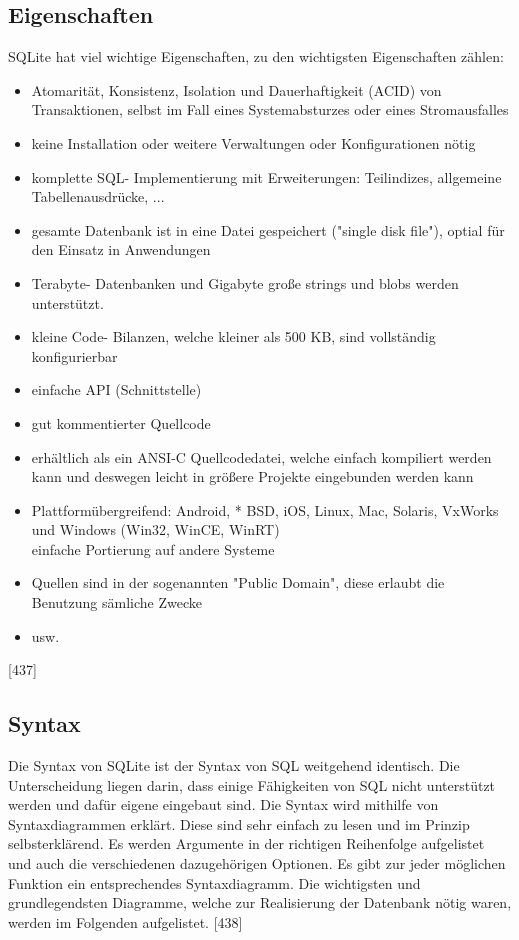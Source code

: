 \documentclass[12pt,a4paper]{report}
\begin{document}
\begin{onehalfspace}
\subsection{Eigenschaften}
SQLite hat viel wichtige Eigenschaften, zu den wichtigsten Eigenschaften zählen:
\begin{itemize}
\item Atomarität, Konsistenz, Isolation und Dauerhaftigkeit (ACID) von Transaktionen, selbst im Fall eines Systemabsturzes oder eines Stromausfalles
\item keine Installation oder weitere Verwaltungen oder Konfigurationen nötig
\item komplette SQL- Implementierung mit Erweiterungen: Teilindizes, allgemeine Tabellenausdrücke, ...
\item gesamte Datenbank ist in eine Datei gespeichert ("{}single disk file"{}), optial für den Einsatz in Anwendungen
\item Terabyte- Datenbanken und Gigabyte große strings und blobs werden unterstützt.
\item kleine Code- Bilanzen, welche kleiner als 500 KB, sind vollständig konfigurierbar
\item einfache API (Schnittstelle)
\item gut kommentierter Quellcode
\item erhältlich als ein ANSI-C Quellcodedatei, welche einfach kompiliert werden kann und deswegen leicht in größere Projekte eingebunden werden kann
\item Plattformübergreifend: Android, * BSD, iOS, Linux, Mac, Solaris, VxWorks und Windows (Win32, WinCE, WinRT)\\
einfache Portierung auf andere Systeme
\item Quellen sind in der sogenannten "{}Public Domain"{}, diese erlaubt die Benutzung sämliche Zwecke
\item usw.
\end{itemize}
[437]
\subsection{Syntax}
Die Syntax von SQLite ist der Syntax von SQL weitgehend identisch. Die Unterscheidung liegen darin, dass einige Fähigkeiten von SQL nicht unterstützt werden und dafür eigene eingebaut sind. Die Syntax wird mithilfe von Syntaxdiagrammen erklärt.
Diese sind sehr einfach zu lesen und im Prinzip selbsterklärend. Es werden Argumente in der richtigen Reihenfolge aufgelistet und auch die verschiedenen dazugehörigen Optionen. Es gibt zur jeder möglichen Funktion ein entsprechendes Syntaxdiagramm. Die wichtigsten und grundlegendsten Diagramme, welche zur Realisierung der Datenbank nötig waren, werden im Folgenden aufgelistet. [438]


\end{onehalfspace}
\end{document}
